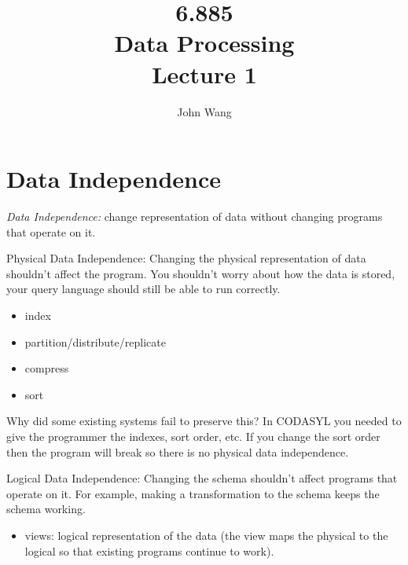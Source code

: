 \documentclass[psamsfonts]{amsart}
\title{6.885 \\
Data Processing \\
Lecture 1}
\author{John Wang}
\begin{document}
\maketitle

\section{Data Independence}

\emph{Data Independence:} change representation of data without changing programs that operate on it.

Physical Data Independence: Changing the physical representation of data shouldn't affect the program. You shouldn't worry about how the data is stored, your query language should still be able to run correctly.
\begin{itemize}
  \item index
  \item partition/distribute/replicate
  \item compress
  \item sort
\end{itemize}

Why did some existing systems fail to preserve this? In CODASYL you needed to give the programmer the indexes, sort order, etc. If you change the sort order then the program will break so there is no physical data independence.

Logical Data Independence: Changing the schema shouldn't affect programs that operate on it. For example, making a transformation to the schema keeps the schema working. 
\begin{itemize}
  \item views: logical representation of the data (the view maps the physical to the logical so that existing programs continue to work).
\end{itemize}
\end{document}
